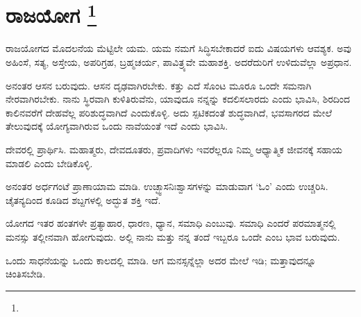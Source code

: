 
\chapter[ರಾಜಯೋಗ ]{ರಾಜಯೋಗ \protect\footnote{}}

ರಾಜಯೋಗದ ಮೊದಲನೆಯ ಮೆಟ್ಟಿಲೇ ಯಮ. ಯಮ ನಮಗೆ ಸಿದ್ಧಿಸಬೇಕಾದರೆ ಐದು ವಿಷಯಗಳು ಆವಶ್ಯಕ. ಅವು ಅಹಿಂಸೆ, ಸತ್ಯ, ಅಸ್ತೇಯ, ಅಪರಿಗ್ರಹ, ಬ್ರಹ್ಮಚರ್ಯ, ಪಾವಿತ್ರ್ಯವೇ ಮಹಾಶಕ್ತಿ. ಅದರೆದುರಿಗೆ ಉಳಿದುವೆಲ್ಲಾ ಅಪ್ರಧಾನ.

ಅನಂತರ ಆಸನ ಬರುವುದು. ಆಸನ ದೃಢವಾಗಿರಬೇಕು. ಕತ್ತು ಎದೆ ಸೊಂಟ ಮೂರೂ ಒಂದೇ ಸಮನಾಗಿ ನೇರವಾಗಿರಬೇಕು. ನಾನು ಸ್ಥಿರವಾಗಿ ಕುಳಿತಿರುವೆನು, ಯಾವುದೂ ನನ್ನನ್ನು ಕದಲಿಸಲಾರದು ಎಂದು ಭಾವಿಸಿ, ಶಿರದಿಂದ ಕಾಲಿನವರೆಗೆ ದೇಹವೆಲ್ಲ ಪರಿಶುದ್ಧವಾಗಿದೆ ಎಂದುಕೊಳ್ಳಿ. ಅದು ಸ್ಪಟಿಕದಂತೆ ಶುದ್ಧವಾಗಿದೆ, ಭವಸಾಗರದ ಮೇಲೆ ತೇಲುವುದಕ್ಕೆ ಯೋಗ್ಯವಾಗಿರುವ ಒಂದು ನಾವೆಯಂತೆ ಇದೆ ಎಂದು ಭಾವಿಸಿ.

ದೇವರಲ್ಲಿ ಪ್ರಾರ್ಥಿಸಿ. ಮಹಾತ್ಮರು, ದೇವದೂತರು, ಪ್ರವಾದಿಗಳು ಇವರೆಲ್ಲರೂ ನಿಮ್ಮ ಆಧ್ಯಾತ್ಮಿಕ ಜೀವನಕ್ಕೆ ಸಹಾಯ ಮಾಡಲಿ ಎಂದು ಬೇಡಿಕೊಳ್ಳಿ.

ಅನಂತರ ಅರ್ಧಗಂಟೆ ಪ್ರಾಣಾಯಾಮ ಮಾಡಿ. ಉಚ್ಛ್ವಾಸನಿಃಶ್ವಾಸಗಳನ್ನು ಮಾಡುವಾಗ ‘ಓಂ’ ಎಂದು ಉಚ್ಚರಿಸಿ. ಚೈತನ್ಯದಿಂದ ಕೂಡಿದ ಶಬ್ದಗಳಲ್ಲಿ ಅದ್ಭುತ ಶಕ್ತಿ ಇದೆ.

ಯೋಗದ ಇತರ ಹಂತಗಳೇ ಪ್ರತ್ಯಾಹಾರ, ಧಾರಣ, ಧ್ಯಾನ, ಸಮಾಧಿ ಎಂಬುವು. ಸಮಾಧಿ ಎಂದರೆ ಪರಮಾತ್ಮನಲ್ಲಿ ಮನಸ್ಸು ತಲ್ಲೀನವಾಗಿ ಹೋಗುವುದು. ಅಲ್ಲಿ ನಾನು ಮತ್ತು ನನ್ನ ತಂದೆ ಇಬ್ಬರೂ ಒಂದೇ ಎಂಬ ಭಾವ ಬರುವುದು.

ಒಂದು ಸಾಧನೆಯನ್ನು ಒಂದು ಕಾಲದಲ್ಲಿ ಮಾಡಿ. ಆಗ ಮನಸ್ಸನ್ನೆಲ್ಲಾ ಅದರ ಮೇಲೆ ಇಡಿ; ಮತ್ತಾವುದನ್ನೂ ಚಿಂತಿಸಬೇಡಿ.


